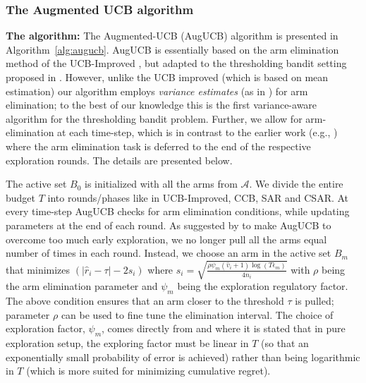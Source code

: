 \documentclass[MS,synopsis]{iitmdiss}
\begin{document}
\subsubsection{The Augmented UCB algorithm}

\textbf{The algorithm:} The Augmented-UCB (AugUCB) algorithm is presented in Algorithm~\ref{alg:augucb}.
AugUCB is essentially based on the arm elimination method of the UCB-Improved \cite{auer2010ucb}, but adapted to the thresholding bandit setting proposed in \cite{locatelli2016optimal}. However, unlike the UCB improved (which is based on mean estimation) our algorithm employs \emph{variance estimates} (as in \cite{audibert2009exploration}) for arm elimination; to the best of our knowledge this is the first variance-aware  algorithm for the thresholding bandit problem. Further, we allow for arm-elimination at each time-step, which is in contrast to the earlier work (e.g., \cite{auer2010ucb,chen2014combinatorial}) where the arm elimination task is deferred to the end of the respective exploration rounds. The details are presented below.

The active set $B_{0}$ is initialized with all the arms from $\mathcal{A}$. We divide the entire budget $T$ into rounds/phases like in UCB-Improved, CCB, SAR and CSAR. At every time-step AugUCB checks for arm elimination conditions, while updating parameters at the end of each round. As suggested by \cite{liu2016modification} to make AugUCB to overcome too much early exploration, we no longer pull all the arms equal number of times in each round. Instead, we choose an arm in the active set $B_m$ that minimizes $(|\hat{r}_{i} - \tau |-2s_i)$ where $s_i  = \sqrt{\frac{\rho\psi_m (\hat{v}_{i}+1) \log ( T \epsilon_{m})}{4 n_{i}}}$ with $\rho$ being the arm elimination parameter and $\psi_{m}$ being the exploration regulatory factor.
The above condition ensures that an arm closer to the threshold $\tau$ is pulled; 
parameter $\rho$ can be used to fine tune the elimination interval.
The choice of exploration factor, $\psi_m$, comes directly from \cite{audibert2010best} and \cite{bubeck2011pure} where it is  stated that in pure exploration setup, the exploring factor must be linear in $T$ (so that an exponentially small probability of error is achieved) rather than being logarithmic in $T$ (which is more suited for minimizing cumulative regret).
\end{document}

